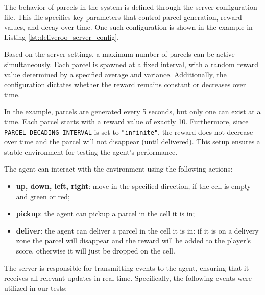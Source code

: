 The behavior of parcels in the system is defined through the server
configuration file. This file specifies key parameters that control parcel generation,
reward values, and decay over time. One such configuration is shown in the
example in Listing \ref{lst:deliveroo_server_config}.

Based on the server settings, a maximum number of parcels can be active simultaneously.
Each parcel is spawned at a fixed interval, with a random reward value determined
by a specified average and variance. Additionally, the configuration dictates whether
the reward remains constant or decreases over time.

In the example, parcels are generated every 5 seconds, but only one can exist at
a time. Each parcel starts with a reward value of exactly 10. Furthermore, since
\texttt{PARCEL\_DECADING\_INTERVAL} is set to \texttt{"infinite"}, the reward
does not decrease over time and the parcel will not disappear (until delivered).
This setup ensures a stable environment for testing the agent's performance.

The agent can interact with the environment using the following actions:
\begin{itemize}
  \item \textbf{up, down, left, right}: move in the specified direction, if the
    cell is empty and green or red;

  \item \textbf{pickup}: the agent can pickup a parcel in the cell it is in;

  \item \textbf{deliver}: the agent can deliver a parcel in the cell it is in:
    if it is on a delivery zone the parcel will disappear and the reward will be
    added to the player's score, otherwise it will just be dropped on the cell.
\end{itemize}

The server is responsible for transmitting events to the agent, ensuring that it
receives all relevant updates in real-time. Specifically, the following events
were utilized in our tests:

